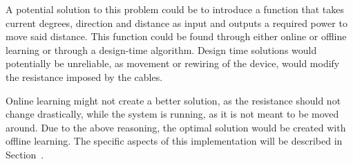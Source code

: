 A potential solution to this problem could be to introduce a function that takes current degrees, direction and distance as input and outputs a required power to move said distance.
This function could be found through either online or offline learning or through a design-time algorithm.
Design time solutions would potentially be unreliable, as movement or rewiring of the device, would modify the resistance imposed by the cables.

Online learning might not create a better solution, as the resistance should not change drastically, while the system is running, as it is not meant to be moved around.
Due to the above reasoning, the optimal solution would be created with offline learning.
The specific aspects of this implementation will be described in Section~.
